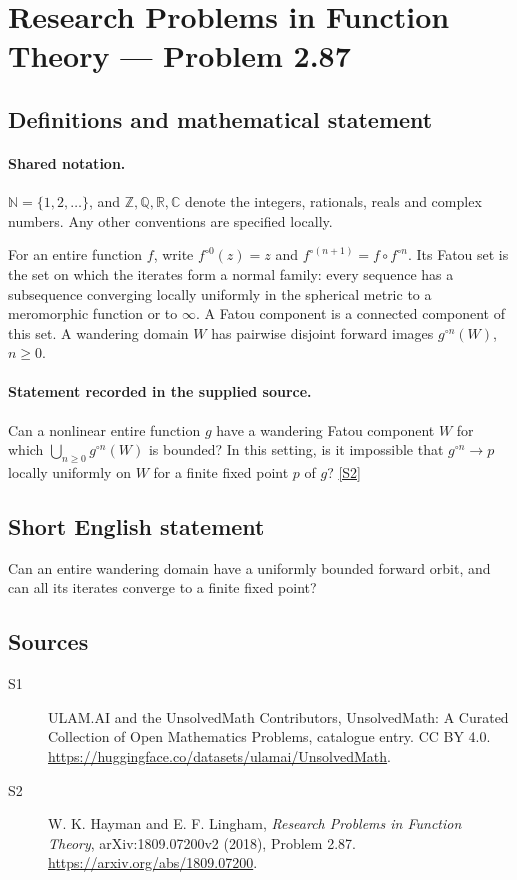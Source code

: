\documentclass[11pt]{article}
\newcommand{\sref}[2]{\hyperlink{source:#1:#2}{[S#2]}}
\begin{document}
\section{Research Problems in Function Theory — Problem 2.87}\label{statement}

\subsection{Definitions and mathematical statement}

\paragraph{Shared notation.}$\mathbb N=\{1,2,\ldots\}$, and $\mathbb Z,\mathbb Q,\mathbb R,\mathbb C$ denote the integers, rationals, reals and complex numbers. Any other conventions are specified locally.


For an entire function $f$, write $f^{\circ0}(z)=z$ and $f^{\circ(n+1)}=f\circ f^{\circ n}$. Its Fatou set is the set on which the iterates form a normal family: every sequence has a subsequence converging locally uniformly in the spherical metric to a meromorphic function or to $\infty$. A Fatou component is a connected component of this set. A wandering domain $W$ has pairwise disjoint forward images $g^{\circ n}(W)$, $n\geq0$.
\paragraph{Statement recorded in the supplied source.}
Can a nonlinear entire function $g$ have a wandering Fatou component $W$ for which $\bigcup_{n\geq0}g^{\circ n}(W)$ is bounded? In this setting, is it impossible that $g^{\circ n}\to p$ locally uniformly on $W$ for a finite fixed point $p$ of $g$? \sref{statement}{2}
\subsection{Short English statement}
Can an entire wandering domain have a uniformly bounded forward orbit, and can all its iterates converge to a finite fixed point?
\subsection{Sources}
\begin{description}
\item[\hypertarget{source:statement:1}{S1}] ULAM.AI and the UnsolvedMath Contributors, UnsolvedMath: A Curated Collection of Open Mathematics Problems, catalogue entry. CC BY 4.0. \url{https://huggingface.co/datasets/ulamai/UnsolvedMath}.
\item[\hypertarget{source:statement:2}{S2}] W. K. Hayman and E. F. Lingham, \emph{Research Problems in Function Theory}, arXiv:1809.07200v2 (2018), Problem 2.87. \url{https://arxiv.org/abs/1809.07200}.
\end{description}
\label{end:statement}
\end{document}
